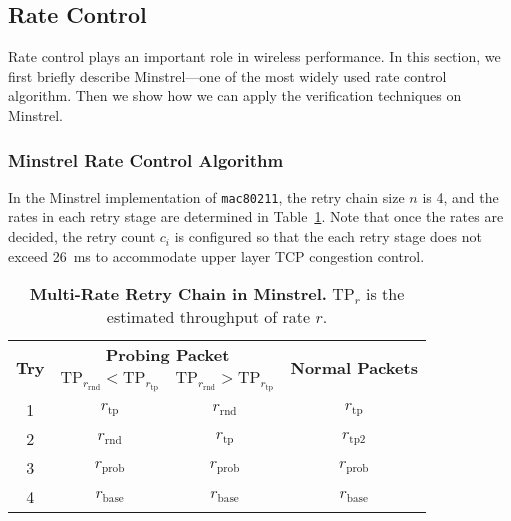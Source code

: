 \subsection{Rate Control}

Rate control plays an important role in wireless performance. In this section,
we first briefly describe Minstrel---one of the most widely used rate control
algorithm. Then we show how we can apply the verification techniques on
Minstrel.

\subsubsection{Minstrel Rate Control Algorithm}


In the Minstrel implementation of \texttt{mac80211}, the retry chain size $n$ is
4, and the rates in each retry stage are determined in Table~\ref{tab:retry}.
Note that once the rates are decided, the retry count $c_i$ is configured so
that the each retry stage does not exceed 26~ms to accommodate upper layer TCP
congestion control.


\begin{table}[h]
  \centering
  \caption{\textbf{Multi-Rate Retry Chain in Minstrel.} $\text{TP}_{r}$ is the
    estimated throughput of rate $r$.}
  \label{tab:retry}
  \begin{tabular}{cccc}
    \toprule
    \multirow{2}{*}{\textbf{Try}} & \multicolumn{2}{c}{\textbf{Probing Packet}} & \multirow{2}{*}{\textbf{Normal Packets}}\\ &
    $\text{TP}_{r_{\text{rnd}}} < \text{TP}_{r_{\text{tp}}}$
    & $\text{TP}_{r_{\text{rnd}}} > \text{TP}_{r_{\text{tp}}}$ & \\
    \midrule
    1 & $r_{\text{tp}}$ & $r_{\text{rnd}}$ & $r_{\text{tp}}$\\
    2 & $r_{\text{rnd}}$ & $r_{\text{tp}}$ & $r_{\text{tp2}}$\\
    3 & $r_{\text{prob}}$ & $r_{\text{prob}}$ & $r_{\text{prob}}$\\
    4 & $r_{\text{base}}$ & $r_{\text{base}}$ & $r_{\text{base}}$\\
    \bottomrule
  \end{tabular}
\end{table}

